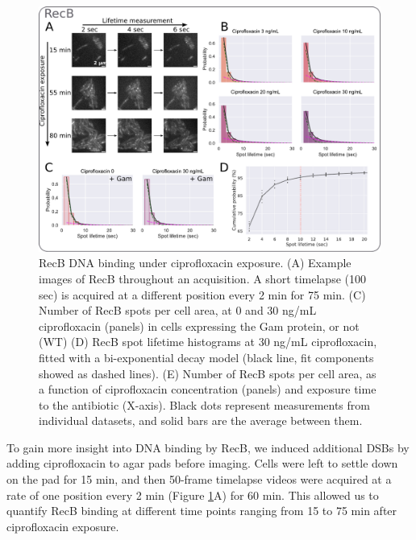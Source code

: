 \begin{figure}[htbp]
\begin{center}
\includegraphics[width=\textwidth]{Figures/Fig2_cipro_nSpots.pdf}
\end{center}
\caption{RecB DNA binding under ciprofloxacin exposure. (A) Example images of RecB throughout an acquisition. A short timelapse (100 sec) is acquired at a different position every 2 min for 75 min. (C) Number of RecB spots per cell area, at 0 and 30 ng/mL ciprofloxacin (panels) in cells expressing the Gam protein, or not (WT) (D) RecB spot lifetime histograms at 30 ng/mL ciprofloxacin, fitted with a bi-exponential decay model (black line, fit components showed as dashed lines). (E) Number of RecB spots per cell area, as a function of ciprofloxacin concentration (panels) and exposure time to the antibiotic (X-axis). Black dots represent measurements from individual datasets, and solid bars are the average between them.}
\label{Fig:nspots}
\end{figure}

To gain more insight into DNA binding by RecB, we induced additional DSBs by adding ciprofloxacin to agar pads before imaging. Cells were left to settle down on the pad for 15 min, and then 50-frame timelapse videos were acquired at a rate of one position every 2 min (Figure \ref{Fig:nspots}A) for 60 min. This allowed us to quantify RecB binding at different time points ranging from 15 to 75 min after ciprofloxacin exposure.



